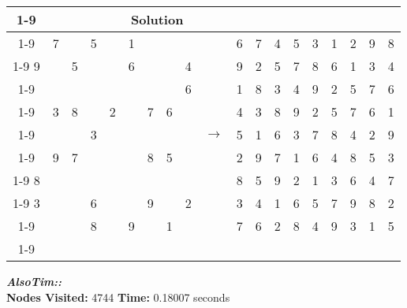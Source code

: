 \documentclass{article}
\begin{document}
\begin{tabular}{||c|c|c||c|c|c||c|c|c|| c ||c|c|c||c|c|c||c|c|c||}
  \cmidrule{1-9} \cmidrule{11-19}
  \multicolumn{9}{|c|}{Problem} &                   & \multicolumn{9}{|c|}{Solution}   \\\cmidrule{1-9} \cmidrule{11-19} \morecmidrules \cmidrule{1-9} \cmidrule{11-19}
  & 7 &   & 5 &   & 1 &   &   &   &  & 6 & 7 & 4 & 5 & 3 & 1 & 2 & 9 & 8\\\cmidrule{1-9} \cmidrule{11-19}
9 &   & 5 &   &   & 6 &   &   & 4 &  & 9 & 2 & 5 & 7 & 8 & 6 & 1 & 3 & 4\\\cmidrule{1-9} \cmidrule{11-19}
  &   &   &   &   &   &   &   & 6 &  & 1 & 8 & 3 & 4 & 9 & 2 & 5 & 7 & 6\\\cmidrule{1-9} \cmidrule{11-19} \morecmidrules \cmidrule{1-9} \cmidrule{11-19}
  & 3 & 8 &   & 2 &   & 7 & 6 &   &  & 4 & 3 & 8 & 9 & 2 & 5 & 7 & 6 & 1\\\cmidrule{1-9} \cmidrule{11-19}
  &   &   & 3 &   &   &   &   &   & $\rightarrow$ & 5 & 1 & 6 & 3 & 7 & 8 & 4 & 2 & 9\\\cmidrule{1-9} \cmidrule{11-19}
  & 9 & 7 &   &   &   & 8 & 5 &   &  & 2 & 9 & 7 & 1 & 6 & 4 & 8 & 5 & 3\\\cmidrule{1-9} \cmidrule{11-19} \morecmidrules \cmidrule{1-9} \cmidrule{11-19}
8 &   &   &   &   &   &   &   &   &  & 8 & 5 & 9 & 2 & 1 & 3 & 6 & 4 & 7\\\cmidrule{1-9} \cmidrule{11-19}
3 &   &   & 6 &   &   & 9 &   & 2 &  & 3 & 4 & 1 & 6 & 5 & 7 & 9 & 8 & 2\\\cmidrule{1-9} \cmidrule{11-19}
  &   &   & 8 &   & 9 &   & 1 &   &  & 7 & 6 & 2 & 8 & 4 & 9 & 3 & 1 & 5\\\cmidrule{1-9} \cmidrule{11-19} \morecmidrules \cmidrule{1-9} \cmidrule{11-19}
\end{tabular}
\newpage
\small\emph{\textbf{AlsoTim::}}\\ \textbf{Nodes Visited:} 4744 \textbf{Time:} 0.18007 seconds\\
\end{document}
